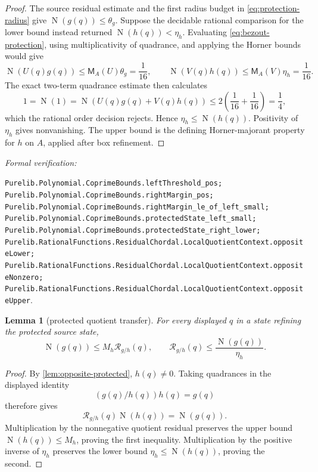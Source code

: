 \documentclass[11pt]{article}
\newtheorem{lemma}[lemma]{Lemma}
\newcommand{\Norm}[1]{\operatorname{N}\!\left(#1\right)}
\newcommand{\leanref}[1]{\par\smallskip\noindent
  \emph{Formal verification:}\par\nobreak
  {\raggedright\nolinkurl{#1}.\par}}
\begin{document}
\begin{proof}
The source residual estimate and the first radius budget in
\eqref{eq:protection-radius} give
$\Norm{g(q)}\le\theta_g$.  Suppose the decidable rational comparison for the
lower bound instead returned $\Norm{h(q)}<\eta_h$.  Evaluating
\eqref{eq:bezout-protection}, using multiplicativity of quadrance, and
applying the Horner bounds would give
\[
 \Norm{U(q)g(q)}\le\mathsf M_A(U)\theta_g=\frac1{16},
 \qquad
 \Norm{V(q)h(q)}\le\mathsf M_A(V)\eta_h=\frac1{16}.
\]
The exact two-term quadrance estimate then calculates
\[
 1=\Norm 1
  =\Norm{U(q)g(q)+V(q)h(q)}
 \le2\left(\frac1{16}+\frac1{16}\right)=\frac14,
\]
which the rational order decision rejects.  Hence
$\eta_h\le\Norm{h(q)}$.  Positivity of $\eta_h$ gives nonvanishing.  The
upper bound is the defining Horner-majorant property for $h$ on $A$, applied
after box refinement.
\end{proof}

\leanref{Purelib.Polynomial.CoprimeBounds.leftThreshold_pos;
Purelib.Polynomial.CoprimeBounds.rightMargin_pos;
Purelib.Polynomial.CoprimeBounds.rightMargin_le_of_left_small;
Purelib.Polynomial.CoprimeBounds.protectedState_left_small;
Purelib.Polynomial.CoprimeBounds.protectedState_right_lower;
Purelib.RationalFunctions.ResidualChordal.LocalQuotientContext.oppositeLower;
Purelib.RationalFunctions.ResidualChordal.LocalQuotientContext.oppositeNonzero;
Purelib.RationalFunctions.ResidualChordal.LocalQuotientContext.oppositeUpper}

\begin{lemma}[protected quotient transfer]
\label{lem:protected-quotient-transfer}
For every displayed $q$ in a state refining the protected source state,
\begin{equation}
\label{eq:quotient-transfer}
 \Norm{g(q)}\le M_h\mathcal R_{g/h}(q),
 \qquad
 \mathcal R_{g/h}(q)\le\frac{\Norm{g(q)}}{\eta_h}.
\end{equation}
\end{lemma}

\begin{proof}
By \cref{lem:opposite-protected}, $h(q)\ne0$.  Taking quadrances in the
displayed identity
\[
                        (g(q)/h(q))h(q)=g(q)
\]
therefore gives
\[
       \mathcal R_{g/h}(q)\Norm{h(q)}=\Norm{g(q)}.
\]
Multiplication by the nonnegative quotient residual preserves the upper
bound $\Norm{h(q)}\le M_h$, proving the first inequality.  Multiplication by
the positive inverse of $\eta_h$ preserves the lower bound
$\eta_h\le\Norm{h(q)}$, proving the second.
\end{proof}
\end{document}
